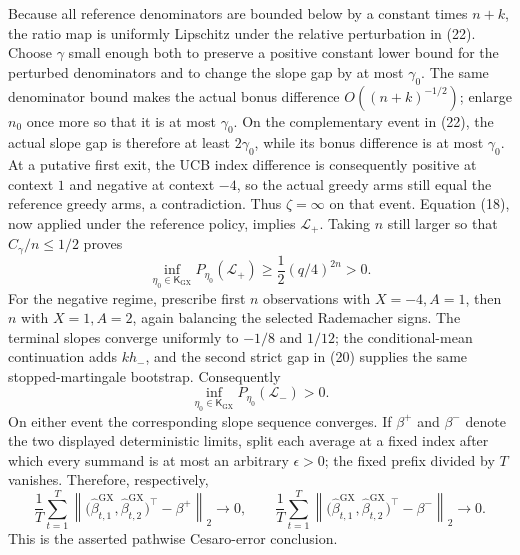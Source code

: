 Because all reference denominators are bounded below by a constant times \(n+k\), the ratio map is uniformly Lipschitz under the relative perturbation in (22).  Choose \(\gamma\) small enough both to preserve a positive constant lower bound for the perturbed denominators and to change the slope gap by at most \(\gamma_0\).  The same denominator bound makes the actual bonus difference \(O((n+k)^{-1/2})\); enlarge \(n_0\) once more so that it is at most \(\gamma_0\).  On the complementary event in (22), the actual slope gap is therefore at least \(2\gamma_0\), while its bonus difference is at most \(\gamma_0\).  At a putative first exit, the UCB index difference is consequently positive at context \(1\) and negative at context \(-4\), so the actual greedy arms still equal the reference greedy arms, a contradiction.  Thus \(\zeta=\infty\) on that event.  Equation (18), now applied under the reference policy, implies \(\mathcal L_+\).  Taking \(n\) still larger so that \(C_\gamma/n\leq1/2\) proves
\[
 \inf_{\eta_0\in\mathsf K_{\mathrm{GX}}}P_{\eta_0}(\mathcal L_+)
 \geq \frac12(q/4)^{2n}>0. \tag{23}
\]
For the negative regime, prescribe first \(n\) observations with \(X=-4,A=1\), then \(n\) with \(X=1,A=2\), again balancing the selected Rademacher signs.  The terminal slopes converge uniformly to \(-1/8\) and \(1/12\); the conditional-mean continuation adds \(kh_-\), and the second strict gap in (20) supplies the same stopped-martingale bootstrap.  Consequently
\[
 \inf_{\eta_0\in\mathsf K_{\mathrm{GX}}}P_{\eta_0}(\mathcal L_-)>0. \tag{24}
\]
On either event the corresponding slope sequence converges.  If \(\beta^+\) and \(\beta^-\) denote the two displayed deterministic limits, split each average at a fixed index after which every summand is at most an arbitrary \(\epsilon>0\); the fixed prefix divided by \(T\) vanishes.  Therefore, respectively,
\[
 \frac1T\sum_{t=1}^T\left\|\bigl(\widehat\beta^{\mathrm{GX}}_{t,1},\widehat\beta^{\mathrm{GX}}_{t,2}\bigr)^\top-\beta^+\right\|_2\longrightarrow0,
 \qquad
 \frac1T\sum_{t=1}^T\left\|\bigl(\widehat\beta^{\mathrm{GX}}_{t,1},\widehat\beta^{\mathrm{GX}}_{t,2}\bigr)^\top-\beta^-\right\|_2\longrightarrow0.
\]
This is the asserted pathwise Cesaro-error conclusion.

